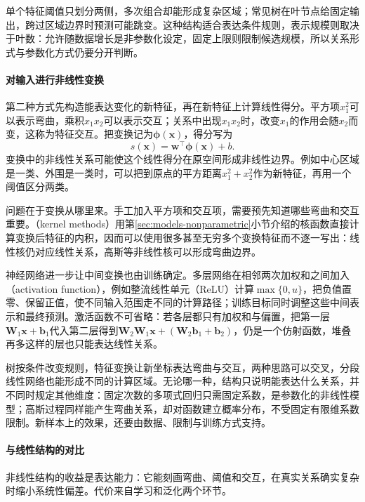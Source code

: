 单个特征阈值只划分两侧，多次组合却能形成复杂区域；常见树在叶节点给固定输出，跨过区域边界时预测可能跳变。这种结构适合表达条件规则，表示规模则取决于叶数：允许随数据增长是非参数化设定，固定上限则限制候选规模，所以关系形式与参数化方式仍要分开判断。

\paragraph{对输入进行非线性变换}

第二种方式先构造能表达变化的新特征，再在新特征上计算线性得分。平方项$x_1^2$可以表示弯曲，乘积$x_1x_2$可以表示交互；关系中出现$x_1x_2$时，改变$x_1$的作用会随$x_2$而变，这称为特征交互。把变换记为$\bm{\phi}(\bm{x})$，得分写为
\begin{equation}
  s(\bm{x})=\bm{w}^{\top}\bm{\phi}(\bm{x})+b.
  \label{eq:models-feature-score}
\end{equation}
变换中的非线性关系可能使这个线性得分在原空间形成非线性边界。例如中心区域是一类、外围是一类时，可以把到原点的平方距离$x_1^2+x_2^2$作为新特征，再用一个阈值区分两类。

问题在于变换从哪里来。手工加入平方项和交互项，需要预先知道哪些弯曲和交互重要。（kernel methods）用第\ref{sec:models-nonparametric}小节介绍的核函数直接计算变换后特征的内积，因而可以使用很多甚至无穷多个变换特征而不逐一写出：线性核仍对应线性关系，高斯等非线性核可以形成弯曲边界。

神经网络进一步让中间变换也由训练确定。多层网络在相邻两次加权和之间加入（activation function），例如整流线性单元（ReLU）计算$\max\{0,u\}$，把负值置零、保留正值，使不同输入范围走不同的计算路径；训练目标同时调整这些中间表示和最终预测。激活函数不可省略：若各层都只有加权和与偏置，把第一层$\bm{W}_1\bm{x}+\bm{b}_1$代入第二层得到$\bm{W}_2\bm{W}_1\bm{x}+(\bm{W}_2\bm{b}_1+\bm{b}_2)$，仍是一个仿射函数，堆叠再多这样的层也只能表达线性关系。

树按条件改变规则，特征变换让新坐标表达弯曲与交互，两种思路可以交叉，分段线性网络也能形成不同的计算区域。无论哪一种，结构只说明能表达什么关系，并不同时规定其他维度：固定次数的多项式回归只需固定系数，是参数化的非线性模型；高斯过程同样能产生弯曲关系，却对函数建立概率分布，不受固定有限维系数限制。新样本上的效果，还要由数据、限制与训练方式支持。

\paragraph{与线性结构的对比}

非线性结构的收益是表达能力：它能刻画弯曲、阈值和交互，在真实关系确实复杂时缩小系统性偏差。代价来自学习和泛化两个环节。

